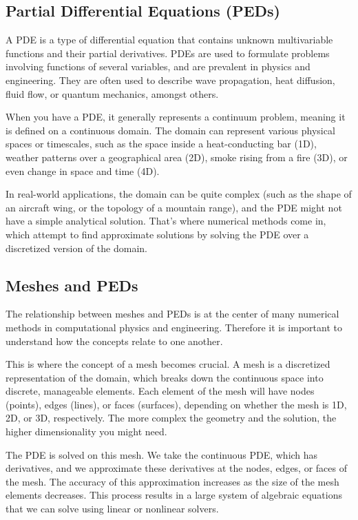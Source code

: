 \documentclass[12pt, a4paper]{scrartcl}
\begin{document}
\subsection{Partial Differential Equations (PEDs)}

A PDE is a type of differential equation that 
contains unknown multivariable functions and their partial derivatives. PDEs are used to 
formulate problems involving functions of several variables, and are prevalent in physics 
and engineering. They are often used to describe wave propagation, heat diffusion, fluid flow, 
or quantum mechanics, amongst others.

When you have a PDE, it generally represents a continuum problem, meaning it is defined 
on a continuous domain. The domain can represent various physical spaces or timescales, 
such as the space inside a heat-conducting bar (1D), weather patterns over a geographical 
area (2D), smoke rising from a fire (3D), or even change in space 
and time (4D).

In real-world applications, the domain can be quite complex (such as the shape of an 
aircraft wing, or the topology of a mountain range), and the PDE might not have a simple 
analytical solution. That's where numerical methods come in, which attempt to find 
approximate solutions by solving the PDE over a discretized version of the domain.

\subsection{Meshes and PEDs}

The relationship between meshes and PEDs is at the center of many numerical methods 
in computational physics and engineering. Therefore it is important to understand how 
the concepts relate to one another.

This is where the concept of a mesh becomes crucial. A mesh is a discretized representation 
of the domain, which breaks down the continuous space into discrete, manageable elements. 
Each element of the mesh will have nodes (points), edges (lines), or faces (surfaces), 
depending on whether the mesh is 1D, 2D, or 3D, respectively. The more complex the geometry 
and the solution, the higher dimensionality you might need.

The PDE is solved on this mesh. We take the continuous 
PDE, which has derivatives, and we approximate these derivatives at the nodes, edges, or 
faces of the mesh. The accuracy of this approximation increases as the size of the mesh 
elements decreases. This process results in a large system of algebraic equations that we 
can solve using linear or nonlinear solvers.
\end{document}
